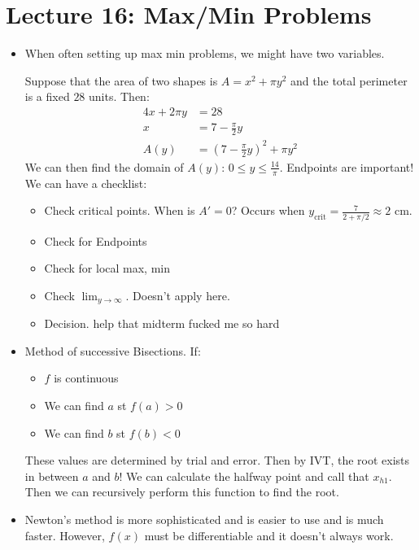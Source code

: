 \section{Lecture 16: Max/Min Problems}
\begin{itemize}
    \item When often setting up max min problems, we might have two variables.
    \begin{example}
        Suppose that the area of two shapes is $A=x^2+\pi y^2$ and the total perimeter is a fixed $28$ units. Then:
        \begin{align}
            4x+2\pi y &= 28 \\
            x &= 7 - \frac{\pi}{2}y \\ 
            A(y) &= \left(7-\frac{\pi}{2}y\right)^2+\pi y^2
        \end{align}
        We can then find the domain of $A(y)$: $0 \le y \le \frac{14}{\pi}$. Endpoints are important! We can have a checklist:
        \begin{itemize}
            \item Check critical points. When is $A'=0$? Occurs when $y_\text{crit} = \frac{7}{2+\pi/2} \approx 2\text{ cm}.$
            \item Check for Endpoints
            \item Check for local max, min
            \item Check $\lim_{y\to\infty}$. Doesn't apply here.
            \item Decision. \small{help that midterm fucked me so hard}
        \end{itemize}
    \end{example}
    \item Method of successive Bisections. If:
    \begin{itemize}
        \item $f$ is continuous
        \item We can find $a$ st $f(a)>0$
        \item We can find $b$ st $f(b)<0$
    \end{itemize}
    These values are determined by trial and error. Then by IVT, the root exists in between $a$ and $b$! We can calculate the halfway point and call that $x_{h1}$. Then we can recursively perform this function to find the root.
    \item Newton's method is more sophisticated and is easier to use and is much faster. However, $f(x)$ must be differentiable and it doesn't always work.

\end{itemize}
